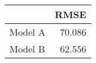 
\begin{tabular}{l|r}
\hline
  & RMSE\\
\hline
Model A & 70.086\\
\hline
Model B & 62.556\\
\hline
\end{tabular}
